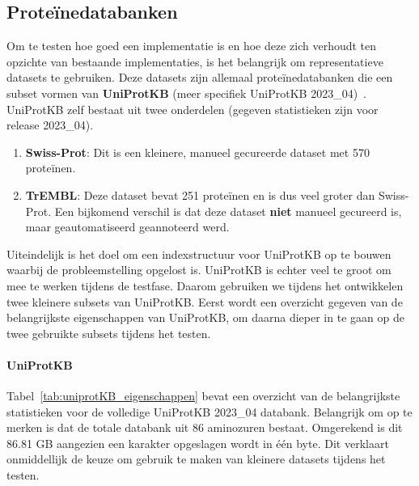 \subsection{Proteïnedatabanken}\label{subsec:proteine-databanken}
Om te testen hoe goed een implementatie is en hoe deze zich verhoudt ten opzichte van bestaande implementaties, is het belangrijk om representatieve datasets te gebruiken.
Deze datasets zijn allemaal proteïnedatabanken die een subset vormen van \textbf{UniProtKB} (meer specifiek UniProtKB 2023\_04)~\cite{UniprotKB}.
UniProtKB zelf bestaat uit twee onderdelen (gegeven statistieken zijn voor release 2023\_04).
\begin{enumerate}
    \item \textbf{Swiss-Prot}: Dit is een kleinere, manueel gecureerde dataset met 570 proteïnen.
    \item \textbf{TrEMBL}: Deze dataset bevat 251 proteïnen en is dus veel groter dan Swiss-Prot.
    Een bijkomend verschil is dat deze dataset \textbf{niet} manueel gecureerd is, maar geautomatiseerd geannoteerd werd.
\end{enumerate}
Uiteindelijk is het doel om een indexstructuur voor UniProtKB op te bouwen waarbij de probleemstelling opgelost is.
UniProtKB is echter veel te groot om mee te werken tijdens de testfase.
Daarom gebruiken we tijdens het ontwikkelen twee kleinere subsets van UniProtKB\@.
Eerst wordt een overzicht gegeven van de belangrijkste eigenschappen van UniProtKB, om daarna dieper in te gaan op de twee gebruikte subsets tijdens het testen.

\paragraph{UniProtKB}
Tabel~\ref{tab:uniprotKB_eigenschappen} bevat een overzicht van de belangrijkste statistieken voor de volledige UniProtKB 2023\_04 databank.
Belangrijk om op te merken is dat de totale databank uit 86 aminozuren bestaat.
Omgerekend is dit 86.81 GB aangezien een karakter opgeslagen wordt in één byte.
Dit verklaart onmiddellijk de keuze om gebruik te maken van kleinere datasets tijdens het testen.

